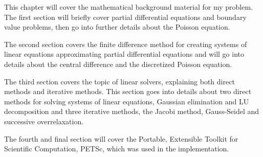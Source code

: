 This chapter will cover the mathematical background material for my problem. The
first section will briefly cover partial differential equations and boundary value
problems, then go into further details about the Poisson equation.

The second section covers the finite difference method for creating systems of
linear equations approximating partial differential equations and will go into
details about the central difference and the discretized Poisson equation.

The third section covers the topic of linear solvers, explaining both direct
methods and iterative methods. This section goes into details about two direct
methods for solving systems of linear equations, Gaussian elimination and LU
decomposition and three iterative methods, the Jacobi method, Gauss-Seidel and
successive overrelaxation.

The fourth and final section will cover the Portable, Extensible Toolkit for
Scientific Computation, PETSc, which was used in the implementation.

